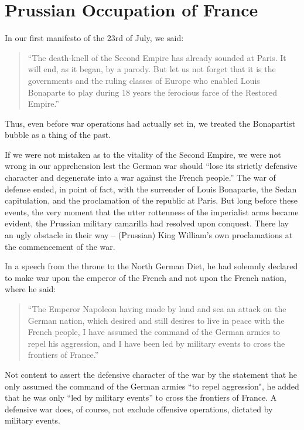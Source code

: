 \documentclass{article}
\begin{document}
\section{Prussian Occupation of France}

In our first manifesto of the 23rd of July, we said:

\begin{quote}

``The death-knell of the Second Empire has already sounded at Paris. It
will end, as it began, by a parody. But let us not forget that it is the
governments and the ruling classes of Europe who enabled Louis Bonaparte
to play during 18 years the ferocious farce of the Restored Empire.''

\end{quote}

Thus, even before war operations had actually set in, we treated the
Bonapartist bubble as a thing of the past.

If we were not mistaken as to the vitality of the Second Empire, we were
not wrong in our apprehension lest the German war should ``lose its
strictly defensive character and degenerate into a war against the French
people.'' The war of defense ended, in point of fact, with the surrender
of Louis Bonaparte, the Sedan capitulation, and the proclamation of the
republic at Paris. But long before these events, the very moment that the
utter rottenness of the imperialist arms became evident, the Prussian
military camarilla had resolved upon conquest. There lay an ugly obstacle
in their way – (Prussian) King William’s own proclamations at the
commencement of the war.

In a speech from the throne to the North German Diet, he had solemnly
declared to make war upon the emperor of the French and not upon the
French nation, where he said:

\begin{quote}

``The Emperor Napoleon having made by land and sea an attack on the German
nation, which desired and still desires to live in peace with the French
people, I have assumed the command of the German armies to repel his
aggression, and I have been led by military events to cross the frontiers
of France.''

\end{quote}

Not content to assert the defensive character of the war by the statement
that he only assumed the command of the German armies “to repel
aggression", he added that he was only “led by military events” to cross
the frontiers of France. A defensive war does, of course, not exclude
offensive operations, dictated by military events.
\end{document}
